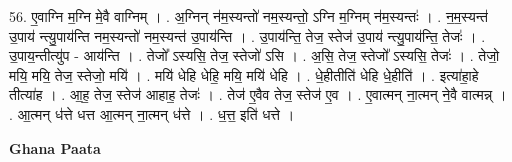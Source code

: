 \documentclass[17pt]{extarticle}
\begin{document}
56. ए॒वाग्नि म॒ग्नि मे॒वै वाग्निम् । . अ॒ग्निन् न॑म॒स्यन्तो॑ नम॒स्यन्तो॒ ऽग्नि म॒ग्निम् न॑म॒स्यन्तः॑ । . न॒म॒स्यन्त॑ उ॒पाय॑ न्त्यु॒पाय॑न्ति नम॒स्यन्तो॑ नम॒स्यन्त॑ उ॒पाय॑न्ति । . उ॒पाय॑न्ति॒ तेज॒ स्तेज॑ उ॒पाय॑ न्त्यु॒पाय॑न्ति॒ तेजः॑ । . उ॒पाय॒न्तीत्यु॑प - आय॑न्ति । . तेजो᳚ ऽस्यसि॒ तेज॒ स्तेजो॑ ऽसि । . अ॒सि॒ तेज॒ स्तेजो᳚ ऽस्यसि॒ तेजः॑ । . तेजो॒ मयि॒ मयि॒ तेज॒ स्तेजो॒ मयि॑ । . मयि॑ धेहि धेहि॒ मयि॒ मयि॑ धेहि । . धे॒हीतीति॑ धेहि धे॒हीति॑ । . इत्या॑हा॒हे तीत्या॑ह । . आ॒ह॒ तेज॒ स्तेज॑ आहाह॒ तेजः॑ । . तेज॑ ए॒वैव तेज॒ स्तेज॑ ए॒व । . ए॒वात्मन् ना॒त्मन् ने॒वै वात्मन्न् । . आ॒त्मन् ध॑त्ते धत्त आ॒त्मन् ना॒त्मन् ध॑त्ते । . ध॒त्त॒ इति॑ धत्ते । \newline

\textbf{Ghana Paata } \newline
\end{document}
